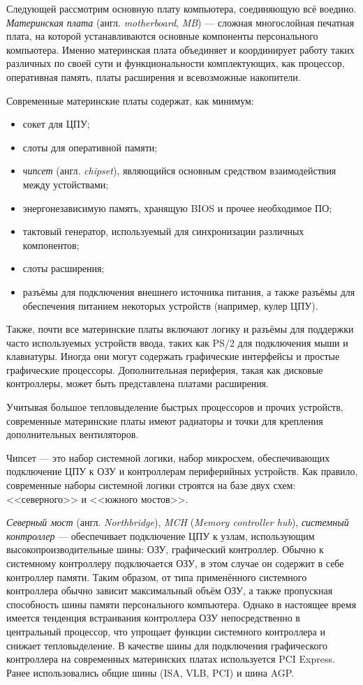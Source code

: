 Следующей рассмотрим основную плату компьютера, соединяющую всё воедино.
\emph{Материнская плата} (англ. \emph{motherboard}, \emph{MB}) --- сложная многослойная печатная плата, на которой устанавливаются основные компоненты персонального компьютера.
Именно материнская плата объединяет и координирует работу таких различных по своей сути и функциональности комплектующих, как процессор, оперативная память, платы расширения и всевозможные накопители.

Современные материнские платы содержат, как минимум:
\begin{itemize}
 \item сокет для ЦПУ;
 \item слоты для оперативной памяти;
 \item \emph{чипсет} (англ. \emph{chipset}), являющийся основным средством взаимодействия между устойствами;
 \item энергонезависимую память, хранящую BIOS и прочее необходимое ПО;
 \item тактовый генератор, используемый для синхронизации различных компонентов;
 \item слоты расширения;
 \item разъёмы для подключения внешнего источника питания, а также разъёмы для обеспечения питанием некоторых устройств (например, кулер ЦПУ).
\end{itemize}

Также, почти все материнские платы включают логику и разъёмы для поддержки часто используемых устройств ввода, таких как PS/2 для подключения мыши и клавиатуры.
Иногда они могут содержать графические интерфейсы и простые графические процессоры.
Дополнительная периферия, такая как дисковые контроллеры, может быть представлена платами расширения.

Учитывая большое тепловыделение быстрых процессоров и прочих устройств, современные материнские платы имеют радиаторы и точки для крепления дополнительных вентиляторов.

Чипсет --- это набор системной логики, набор микросхем, обеспечивающих подключение ЦПУ к ОЗУ и контроллерам периферийных устройств.
Как правило, современные наборы системной логики строятся на базе двух схем: <<северного>> и <<южного мостов>>.

\emph{Северный мост} (англ. \emph{Northbridge}), \emph{MCH} (\emph{Memory controller hub}), \emph{системный контроллер} --- обеспечивает подключение ЦПУ к узлам, использующим высокопроизводительные шины: ОЗУ, графический контроллер.
Обычно к системному контроллеру подключается ОЗУ, в этом случае он содержит в себе контроллер памяти.
Таким образом, от типа применённого системного контроллера обычно зависит максимальный объём ОЗУ, а также пропускная способность шины памяти персонального компьютера.
Однако в настоящее время имеется тенденция встраивания контроллера ОЗУ непосредственно в центральный процессор, что упрощает функции системного контроллера и снижает тепловыделение.
В качестве шины для подключения графического контроллера на современных материнских платах используется PCI Express.
Ранее использовались общие шины (ISA, VLB, PCI) и шина AGP.

